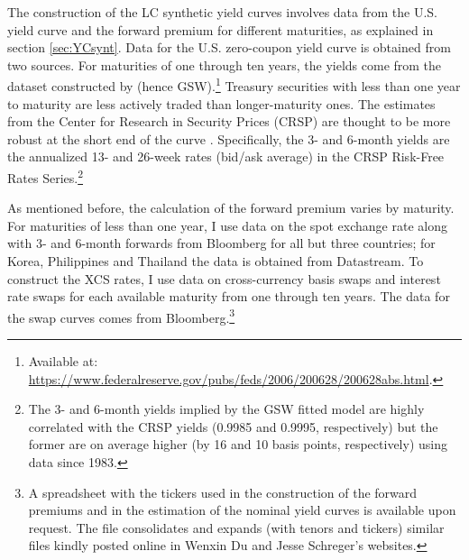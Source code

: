 {The construction of the LC synthetic yield curves involves data from the U.S. yield curve and the forward premium for different maturities, as explained in section \ref{sec:YCsynt}. 
Data for the U.S. zero-coupon yield curve is obtained from two sources. 
For maturities of one through ten years, the yields come from the dataset constructed by \cite*{GSW:2007} (hence GSW).\footnote{Available at: \url{https://www.federalreserve.gov/pubs/feds/2006/200628/200628abs.html}.} 
Treasury securities with less than one year to maturity are less actively traded than longer-maturity ones. 
The estimates from the Center for Research in Security Prices (CRSP) are thought to be more robust at the short end of the curve \citep{Duffee:2010}.
Specifically, the 3- and 6-month yields are the annualized 13- and 26-week rates (bid/ask average) in the CRSP Risk-Free Rates Series.\footnote{ The 3- and 6-month yields implied by the GSW fitted model are highly correlated with the CRSP yields (0.9985 and 0.9995, respectively) but the former are on average higher (by 16 and 10 basis points, respectively) using data since 1983.} 

As mentioned before, the calculation of the forward premium varies by maturity.
For maturities of less than one year, I use data on the spot exchange rate along with 3- and 6-month forwards from Bloomberg for all but three countries; for Korea, Philippines and Thailand the data is obtained from Datastream.
To construct the XCS rates, I use data on cross-currency basis swaps and interest rate swaps for each available maturity from one through ten years. 
The data for the swap curves comes from Bloomberg.\footnote{A spreadsheet with the tickers used in the construction of the forward premiums and in the estimation of the nominal yield curves is available upon request. The file consolidates and expands (with tenors and tickers) similar files kindly posted online in Wenxin Du and Jesse Schreger's websites.}

}
